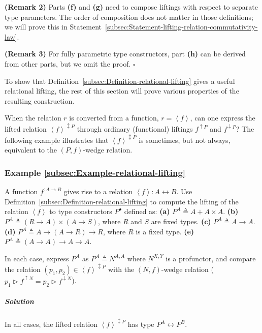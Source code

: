 \textbf{(Remark 2)} Parts \textbf{(f)} and \textbf{(g)} need to compose
liftings with respect to separate type parameters. The order of composition
does not matter in those definitions; we will prove this in Statement~\ref{subsec:Statement-lifting-relation-commutativity-law}.

\textbf{(Remark 3)} For fully parametric type constructors, part \textbf{(h)}
can be derived from other parts, but we omit the proof. $\square$

To show that Definition~\ref{subsec:Definition-relational-lifting}
gives a useful relational lifting, the rest of this section will prove
various properties of the resulting construction. 

When the relation $r$ is converted from a function, $r=\left<f\right>$,
can one express the lifted relation $\left<f\right>^{\updownarrow P}$
through ordinary (functional) liftings $f^{\uparrow P}$ and $f^{\downarrow P}$?
The following example illustrates that $\left<f\right>^{\updownarrow P}$
is sometimes, but not always, equivalent to the $\left(P,f\right)$-wedge
relation.

\subsubsection{Example \label{subsec:Example-relational-lifting}\ref{subsec:Example-relational-lifting}}

A function $f^{:A\rightarrow B}$ gives rise to a relation $\left<f\right>:A\leftrightarrow B$.
Use Definition~\ref{subsec:Definition-relational-lifting} to compute
the lifting of the relation $\left<f\right>$ to type constructors
$P^{\bullet}$ defined as: \textbf{(a)} $P^{A}\triangleq A+A\times A$.
\textbf{(b)} $P^{A}\triangleq(R\rightarrow A)\times(A\rightarrow S)$,
where $R$ and $S$ are fixed types. \textbf{(c)} $P^{A}\triangleq A\rightarrow A$.
\textbf{(d)} $P^{A}\triangleq A\rightarrow\left(A\rightarrow R\right)\rightarrow R$,
where $R$ is a fixed type. \textbf{(e)} $P^{A}\triangleq\left(A\rightarrow A\right)\rightarrow A\rightarrow A$.

In each case, express $P^{A}$ as $P^{A}\triangleq N^{A,A}$ where
$N^{X,Y}$ is a profunctor, and compare the relation $(p_{1},p_{2})\in\left<f\right>^{\updownarrow P}$
with the $\left(N,f\right)$-wedge relation ($p_{1}\triangleright f^{\uparrow N}=p_{2}\triangleright f^{\downarrow N}$). 

\subparagraph{Solution}

In all cases, the lifted relation $\left<f\right>^{\updownarrow P}$
has type $P^{A}\leftrightarrow P^{B}$.

